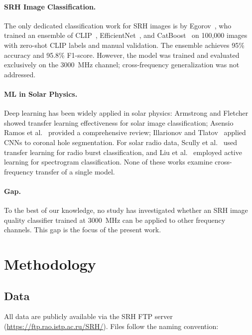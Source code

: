 \documentclass{article}
\theoremstyle{plain}
\theoremstyle{definition}
\begin{document}
\paragraph{SRH Image Classification.} The only dedicated classification
work for SRH images is by Egorov~\cite{egorov2025}, who trained an
ensemble of CLIP~\cite{radford2021}, EfficientNet~\cite{tan2020},
and CatBoost~\cite{dorogush2018} on 100,000 images with zero-shot CLIP
labels and manual validation.  The ensemble achieves 95\% accuracy and
95.8\% F1-score.  However, the model was trained and evaluated
exclusively on the 3000~MHz channel; cross-frequency generalization was
not addressed.

\paragraph{ML in Solar Physics.} Deep learning has been widely applied
in solar physics: Armstrong and Fletcher~\cite{armstrong2019} showed
transfer learning effectiveness for solar image classification;
Asensio Ramos et al.~\cite{asensio2023} provided a comprehensive review;
Illarionov and Tlatov~\cite{illarionov2018} applied CNNs to coronal
hole segmentation.  For solar radio data, Scully et
al.~\cite{scully2025} used transfer learning for radio burst
classification, and Liu et al.~\cite{liu2025} employed active learning
for spectrogram classification.  None of these works examine
cross-frequency transfer of a single model.

\paragraph{Gap.} To the best of our knowledge, no study has
investigated whether an SRH image quality classifier trained at
3000~MHz can be applied to other frequency channels.  This gap is the
focus of the present work.

\section{Methodology}
\label{sec:method}

\subsection{Data}
\label{sec:data}

All data are publicly available via the SRH FTP server
(\url{https://ftp.rao.istp.ac.ru/SRH/}).  Files follow the naming
convention:
\end{document}
